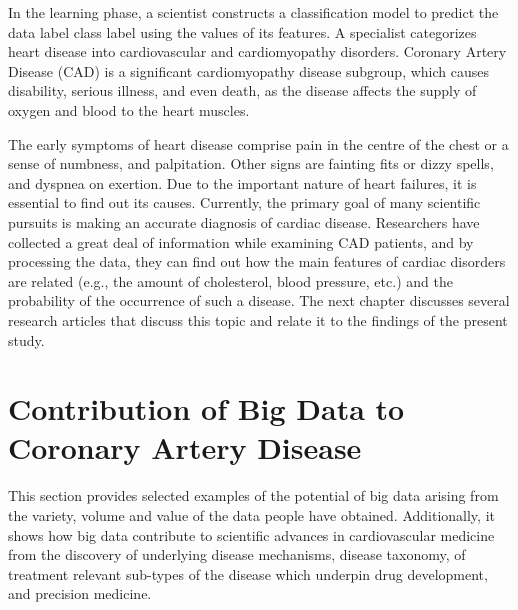 \documentclass[sigconf]{acmart}
\begin{document}
In the learning phase, a scientist constructs a classification model to predict the data label class label using the values of its features.
A specialist categorizes heart disease into cardiovascular and cardiomyopathy disorders.
Coronary Artery Disease (CAD) is a significant cardiomyopathy disease subgroup, which causes disability, serious illness, and even death, as the disease affects the supply of oxygen and blood to the heart muscles.
\par The early symptoms of heart disease comprise pain in the centre of the chest or a sense of numbness, and palpitation.
Other signs are fainting fits or dizzy spells, and dyspnea on exertion.
Due to the important nature of heart failures, it is essential to find out its causes.
Currently, the primary goal of many scientific pursuits is making an accurate diagnosis of cardiac disease.
Researchers have collected a great deal of information while examining CAD patients, and by processing the data, they can find out how the main features of cardiac disorders are related (e.g.,  the amount of cholesterol, blood pressure, etc.) and the probability of the occurrence of such a disease.
The next chapter discusses several research articles that discuss this topic and relate it to the findings of the present study.


\section{Contribution of Big Data to Coronary Artery Disease}

This section provides selected examples of the potential of big data arising from the variety, volume and value of the data people have obtained.
Additionally, it shows how big data contribute to scientific advances in cardiovascular medicine from the discovery of underlying disease mechanisms, disease taxonomy, of treatment relevant sub-types of the disease which underpin drug development, and precision medicine.
\end{document}
